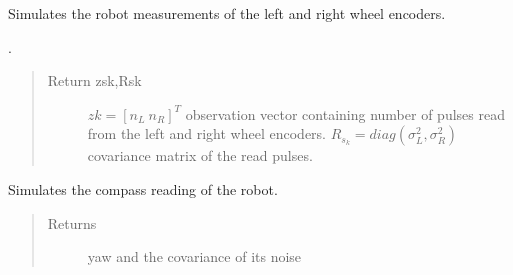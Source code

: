 \documentclass[letterpaper,10pt,english]{sphinxmanual}
\begin{document}
\begin{fulllineitems}
\begin{fulllineitems}
\end{fulllineitems}


\begin{fulllineitems}
\label{\detokenize{robot_simulation:DifferentialDriveSimulatedRobot.DifferentialDriveSimulatedRobot.ReadEncoders}}
\sphinxAtStartPar
Simulates the robot measurements of the left and right wheel encoders.

\sphinxAtStartPar
{}.
\begin{quote}\begin{description}
\item[{Return zsk,Rsk}] \leavevmode
\sphinxAtStartPar
\(zk=[n_L~n_R]^T\) observation vector containing number of pulses read from the left and right wheel encoders. \(R_{s_k}=diag(\sigma_L^2,\sigma_R^2)\) covariance matrix of the read pulses.

\end{description}\end{quote}

\end{fulllineitems}


\begin{fulllineitems}
\label{\detokenize{robot_simulation:DifferentialDriveSimulatedRobot.DifferentialDriveSimulatedRobot.ReadCompass}}
\sphinxAtStartPar
Simulates the compass reading of the robot.
\begin{quote}\begin{description}
\item[{Returns}] \leavevmode
\sphinxAtStartPar
yaw and the covariance of its noise 

\end{description}\end{quote}

\end{fulllineitems}


\end{fulllineitems}
\end{document}
